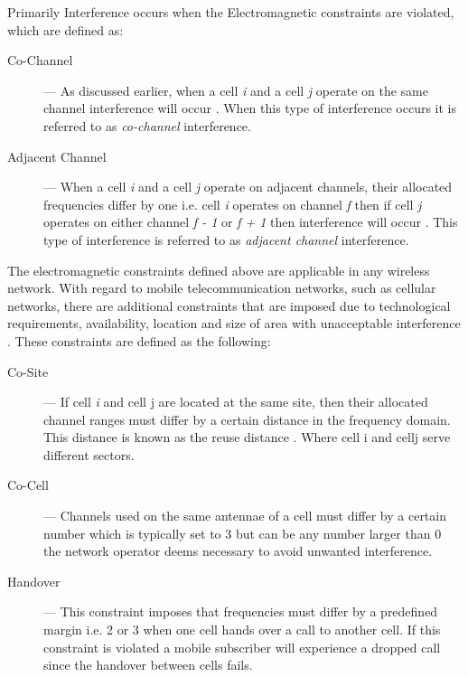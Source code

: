 Primarily Interference occurs when the Electromagnetic constraints are violated, which are defined as:
\begin{description}
\item[Co-Channel] --- As discussed earlier, when a cell \emph{i} and a cell \emph{j} operate on the same channel interference will occur \cite{WirelessCommunications,WirelessDigitalCommunications,GSMSysEngin,PrinciplesMobileCommunication,Eisenblatter,EfficientEvoChannelManagement,Karen2004,ACOvsEA,InterferenceOrientatedFAP}. When this type of interference occurs it is referred to as \emph{co-channel} interference.
\item[Adjacent Channel] --- When a cell \emph{i} and a cell \emph{j} operate on adjacent channels, their allocated frequencies differ by one i.e. cell \emph{i} operates on channel \emph{f} then if cell \emph{j} operates on either channel \emph{f - 1} or \emph{f + 1} then interference will occur \cite{WirelessCommunications,WirelessDigitalCommunications,GSMSysEngin,PrinciplesMobileCommunication,Eisenblatter,EfficientEvoChannelManagement,Karen2004,ACOvsEA,InterferenceOrientatedFAP}. This type of interference is referred to as \emph{adjacent channel} interference.
\end{description}

The electromagnetic constraints defined above are applicable in any wireless network. With regard to mobile telecommunication networks, such as cellular networks, there are additional constraints that are imposed due to technological requirements, availability, location and size of area with unacceptable interference \cite{Karen2004,Eisenblatter,AndreasPaper}. These constraints are defined as the following:
\begin{description}
\item[Co-Site] --- If cell \emph{i} and cell {j} are located at the same site, then their allocated channel ranges must differ by a certain distance in the frequency domain. This distance is known as the reuse distance \cite{FixedFAPPSO,EgyptFAPPSO,Karen2004,AdreasPaper}. Where cell {i} and cell{j} serve different sectors.
\item[Co-Cell] --- Channels used on the same antennae of a cell must differ by a certain number which is typically set to 3 but can be any number larger than 0 the network operator deems necessary to avoid unwanted interference\cite{Karen200,Eisenblatter,AndreasPaper}.
\item[Handover] --- This constraint imposes that frequencies must differ by a predefined margin i.e. 2 or 3 when one cell hands over a call to another cell. If this constraint is violated a mobile subscriber will experience a dropped call since the handover between cells fails\cite{Karen200,Eisenblatter,AndreasPaper}.
\end{description}

